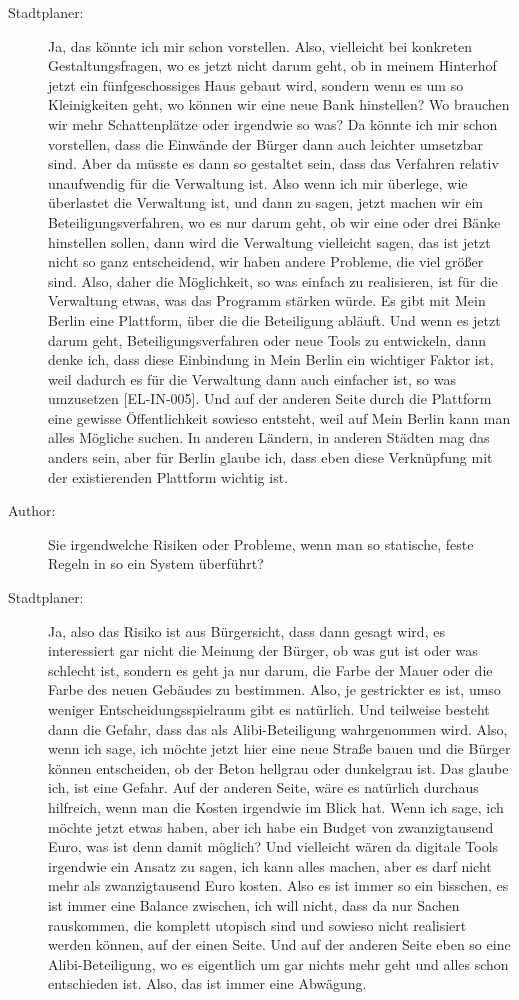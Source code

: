 \begin{description}
\item[Stadtplaner:] Ja, das könnte ich mir schon vorstellen. Also, vielleicht bei konkreten Gestaltungsfragen, wo es jetzt nicht darum geht, ob in meinem Hinterhof jetzt ein fünfgeschossiges Haus gebaut wird, sondern wenn es um so Kleinigkeiten geht, wo können wir eine neue Bank hinstellen? Wo brauchen wir mehr Schattenplätze oder irgendwie so was? Da könnte ich mir schon vorstellen, dass die Einwände der Bürger dann auch leichter umsetzbar sind. Aber da müsste es dann so gestaltet sein, dass das Verfahren relativ unaufwendig für die Verwaltung ist. Also wenn ich mir überlege, wie überlastet die Verwaltung ist, und dann zu sagen, jetzt machen wir ein Beteiligungsverfahren, wo es nur darum geht, ob wir eine oder drei Bänke hinstellen sollen, dann wird die Verwaltung vielleicht sagen, das ist jetzt nicht so ganz entscheidend, wir haben andere Probleme, die viel größer sind. Also, daher die Möglichkeit, so was einfach zu realisieren, ist für die Verwaltung etwas, was das Programm stärken würde. Es gibt mit Mein Berlin eine Plattform, über die die Beteiligung abläuft. Und wenn es jetzt darum geht, Beteiligungsverfahren oder neue Tools zu entwickeln, dann denke ich, dass diese Einbindung in Mein Berlin ein wichtiger Faktor ist, weil dadurch es für die Verwaltung dann auch einfacher ist, so was umzusetzen [EL-IN-005]. Und auf der anderen Seite durch die Plattform eine gewisse Öffentlichkeit sowieso entsteht, weil auf Mein Berlin kann man alles Mögliche suchen. In anderen Ländern, in anderen Städten mag das anders sein, aber für Berlin glaube ich, dass eben diese Verknüpfung mit der existierenden Plattform wichtig ist.
\item[Author:] Sie irgendwelche Risiken oder Probleme, wenn man so statische, feste Regeln in so ein System überführt?
\item[Stadtplaner:] Ja, also das Risiko ist aus Bürgersicht, dass dann gesagt wird, es interessiert gar nicht die Meinung der Bürger, ob was gut ist oder was schlecht ist, sondern es geht ja nur darum, die Farbe der Mauer oder die Farbe des neuen Gebäudes zu bestimmen. Also, je gestrickter es ist, umso weniger Entscheidungsspielraum gibt es natürlich. Und teilweise besteht dann die Gefahr, dass das als Alibi-Beteiligung wahrgenommen wird. Also, wenn ich sage, ich möchte jetzt hier eine neue Straße bauen und die Bürger können entscheiden, ob der Beton hellgrau oder dunkelgrau ist. Das glaube ich, ist eine Gefahr. Auf der anderen Seite, wäre es natürlich durchaus hilfreich, wenn man die Kosten irgendwie im Blick hat. Wenn ich sage, ich möchte jetzt etwas haben, aber ich habe ein Budget von zwanzigtausend Euro, was ist denn damit möglich? Und vielleicht wären da digitale Tools irgendwie ein Ansatz zu sagen, ich kann alles machen, aber es darf nicht mehr als zwanzigtausend Euro kosten. Also es ist immer so ein bisschen, es ist immer eine Balance zwischen, ich will nicht, dass da nur Sachen rauskommen, die komplett utopisch sind und sowieso nicht realisiert werden können, auf der einen Seite. Und auf der anderen Seite eben so eine Alibi-Beteiligung, wo es eigentlich um gar nichts mehr geht und alles schon entschieden ist. Also, das ist immer eine Abwägung.

\end{description}
